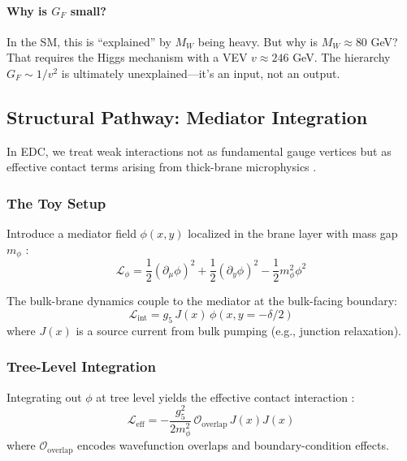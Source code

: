 \paragraph{Why is $G_F$ small?}
In the SM, this is ``explained'' by $M_W$ being heavy. But why is $M_W \approx 80$ GeV?
That requires the Higgs mechanism with a VEV $v \approx 246$ GeV. The hierarchy
$G_F \sim 1/v^2$ is ultimately unexplained---it's an input, not an output.

\subsection{Structural Pathway: Mediator Integration}
\label{sec:ch11_structural}

In EDC, we treat weak interactions not as fundamental gauge vertices but as
effective contact terms arising from thick-brane microphysics \tagDc{}.

\subsubsection{The Toy Setup}

Introduce a mediator field $\phi(x,y)$ localized in the brane layer with mass
gap $m_\phi$ \tagP{}:
\begin{equation}
    \mathcal{L}_\phi = \frac{1}{2}(\partial_\mu\phi)^2 + \frac{1}{2}(\partial_y\phi)^2
    - \frac{1}{2}m_\phi^2 \phi^2
    \label{eq:ch11_L_phi}
\end{equation}

The bulk-brane dynamics couple to the mediator at the bulk-facing boundary:
\begin{equation}
    \mathcal{L}_{\text{int}} = g_5 \, J(x) \, \phi(x, y = -\delta/2)
    \label{eq:ch11_L_int}
\end{equation}
where $J(x)$ is a source current from bulk pumping (e.g., junction relaxation).

\subsubsection{Tree-Level Integration}

Integrating out $\phi$ at tree level yields the effective contact interaction
\tagDc{}:
\begin{equation}
    \boxed{
    \mathcal{L}_{\text{eff}} = -\frac{g_5^2}{2m_\phi^2} \,
    \mathcal{O}_{\text{overlap}} \, J(x) J(x)
    }
    \label{eq:ch11_Leff}
\end{equation}
where $\mathcal{O}_{\text{overlap}}$ encodes wavefunction overlaps and
boundary-condition effects.

